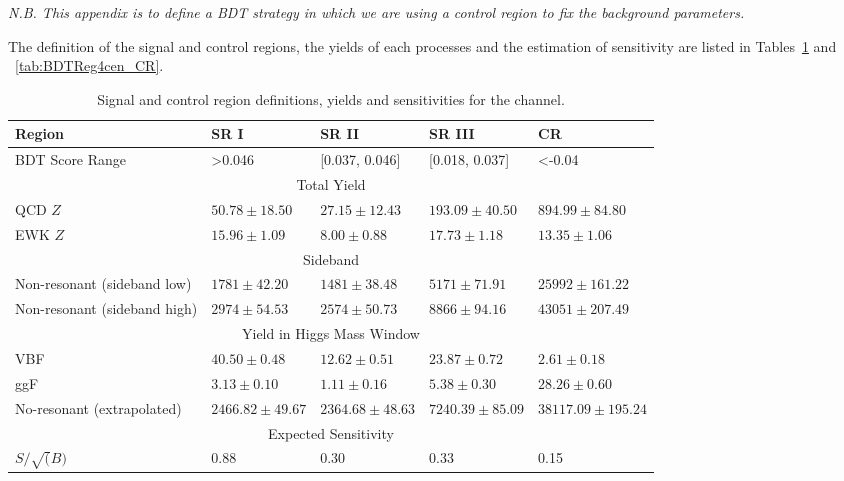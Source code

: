 
{\it N.B.  This appendix is to define a BDT strategy in which we are using a control region to fix the background parameters.}

The definition of the signal and control regions, the yields of each processes and the estimation of sensitivity are listed in Tables~\ref{tab:BDTReg2cen_CR} and ~\ref{tab:BDTReg4cen_CR}. 


\begin{table}[htbp]
\centering
\caption{Signal and control region definitions, yields and sensitivities for the \twocentral channel. }
\label{tab:BDTReg2cen_CR}
\begin{tabular}{|l|l|l|l|l|}
\hline
Region          & SR I               & SR II               & SR III             & CR                    \\ \hline
BDT Score Range & \textgreater0.046  & {[}0.037, 0.046{]}  & {[}0.018, 0.037{]} & \textless-0.04        \\ \hline
\multicolumn{5}{|c|}{Total Yield}                                                        \\ \hline
QCD $Z$ & $50.78 \pm 18.50$ & $27.15 \pm 12.43$ & $193.09 \pm 40.50$   &  $894.99 \pm 84.80$    \\ \cline{2-5} 
EWK $Z$&  $15.96 \pm 1.09$ &  $8.00 \pm 0.88$  & $17.73 \pm 1.18$  &  $13.35 \pm 1.06$    \\ \hline

\multicolumn{5}{|c|}{Sideband}  \\ \hline
Non-resonant (sideband low)     & $1781 \pm 42.20$  & $1481 \pm 38.48 $ & $5171 \pm 71.91$ & $25992 \pm 161.22$    \\ \cline{2-5} 
Non-resonant (sideband high)    & $2974 \pm 54.53$  & $2574 \pm 50.73 $ & $8866 \pm 94.16$ & $43051 \pm 207.49$    \\ \hline

\multicolumn{5}{|c|}{Yield in Higgs Mass Window}                                                        \\ \hline
VBF             & $40.50 \pm 0.48$   & $12.62\pm 0.51$     & $23.87\pm 0.72$    & $2.61 \pm 0.18$       \\ \cline{2-5} 
ggF             & $3.13 \pm 0.10$    & $1.11\pm 0.16$      & $5.38\pm 0.30$     & $28.26\pm 0.60$       \\ \cline{2-5}
No-resonant (extrapolated)    & $2466.82 \pm 49.67$ & $2364.68 \pm 48.63$ & $7240.39\pm 85.09$ & $38117.09 \pm 195.24$ \\ \hline
\multicolumn{5}{|c|}{Expected Sensitivity}                                                              \\ \hline
$S/ \sqrt(B)$   & 0.88               & 0.30                & 0.33               & 0.15                  \\ \hline
\end{tabular}
\end{table}


